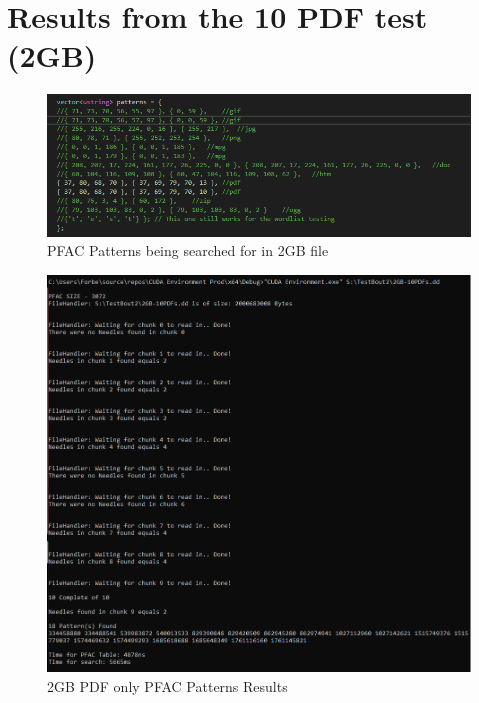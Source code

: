 \section{Results from the 10 PDF test (2GB)}

\begin{figure}[!ht]
    \centering
    \includegraphics[width=\linewidth]{Images/Tests/2GB/Aletheia-PDF-Patts.png}
    \caption{\ac{PFAC} Patterns being searched for in 2GB file}
    \label{fig:2gbPFACPatterns}
\end{figure}
\begin{figure}[!ht]
    \centering
    \includegraphics[width=\linewidth]{Images/Tests/2GB/Aletheia-PDF-Only.png}
    \caption{2\ac{GB} PDF only \ac{PFAC} Patterns Results}
    \label{fig:2gbPFACResults}
\end{figure}
\newpage

